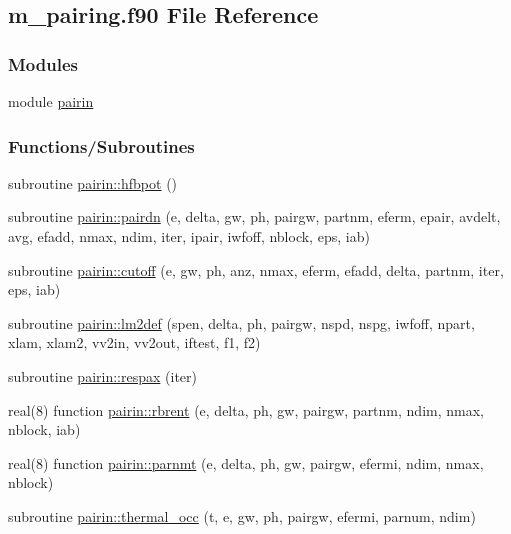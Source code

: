 \hypertarget{m__pairing_8f90}{}\subsection{m\+\_\+pairing.\+f90 File Reference}
\label{m__pairing_8f90}
\subsubsection*{Modules}
\begin{DoxyCompactItemize}
\item 
module \hyperlink{namespacepairin}{pairin}
\end{DoxyCompactItemize}
\subsubsection*{Functions/\+Subroutines}
\begin{DoxyCompactItemize}
\item 
subroutine \hyperlink{namespacepairin_a6ce2e07b5ba93f003706e2458674f7dc}{pairin\+::hfbpot} ()
\item 
subroutine \hyperlink{namespacepairin_a667237dace8029f85c201bd33dbb0307}{pairin\+::pairdn} (e, delta, gw, ph, pairgw, partnm, eferm, epair, avdelt, avg, efadd, nmax, ndim, iter, ipair, iwfoff, nblock, eps, iab)
\item 
subroutine \hyperlink{namespacepairin_a28899d1f01ffe00a01d0c686ddeb4243}{pairin\+::cutoff} (e, gw, ph, anz, nmax, eferm, efadd, delta, partnm, iter, eps, iab)
\item 
subroutine \hyperlink{namespacepairin_af4e7513dca082d2c4128a1c638c6540c}{pairin\+::lm2def} (spen, delta, ph, pairgw, nspd, nspg, iwfoff, npart, xlam, xlam2, vv2in, vv2out, iftest, f1, f2)
\item 
subroutine \hyperlink{namespacepairin_a7edcef81564650b6ee0d2aa1836e1559}{pairin\+::respax} (iter)
\item 
real(8) function \hyperlink{namespacepairin_aa8ca2b543b3207c7ba2de8c3d3ec6fe2}{pairin\+::rbrent} (e, delta, ph, gw, pairgw, partnm, ndim, nmax, nblock, iab)
\item 
real(8) function \hyperlink{namespacepairin_a06d24fef8597829abc91dd966f48c21e}{pairin\+::parnmt} (e, delta, ph, gw, pairgw, efermi, ndim, nmax, nblock)
\item 
subroutine \hyperlink{namespacepairin_ad59063b8706217edfe3bea2685433713}{pairin\+::thermal\+\_\+occ} (t, e, gw, ph, pairgw, efermi, parnum, ndim)
\end{DoxyCompactItemize}
